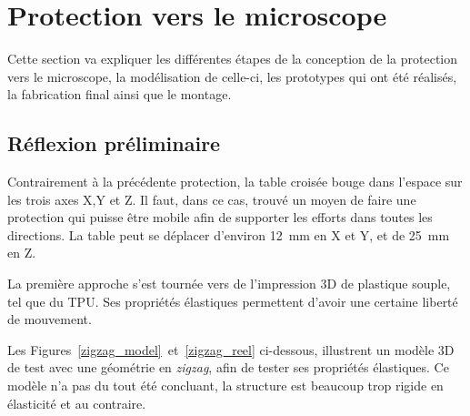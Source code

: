 \section{Protection vers le microscope}
Cette section va expliquer les différentes étapes de la conception de la protection vers le microscope, la
modélisation de celle-ci, les prototypes qui ont été réalisés, la fabrication final ainsi
que le montage.
\subsection{Réflexion préliminaire}
Contrairement à la précédente protection, la table croisée bouge dans l'espace sur les trois axes X,Y et Z. Il faut, dans ce cas, trouvé un moyen de faire une protection qui puisse être mobile afin de supporter les efforts dans toutes les directions. La table peut se déplacer d'environ 12~mm en X et Y, et de 25~mm en Z.

La première approche s'est tournée vers de l'impression 3D de plastique souple, tel que du TPU. Ses propriétés élastiques permettent d'avoir une certaine liberté de mouvement.

Les Figures~\ref{zigzag_model}~et~\ref{zigzag_reel} ci-dessous, illustrent un modèle 3D de test avec une géométrie en \textit{zigzag}, afin de tester ses propriétés élastiques. Ce modèle n'a pas du tout été concluant, la structure est beaucoup trop rigide en élasticité et au contraire.

